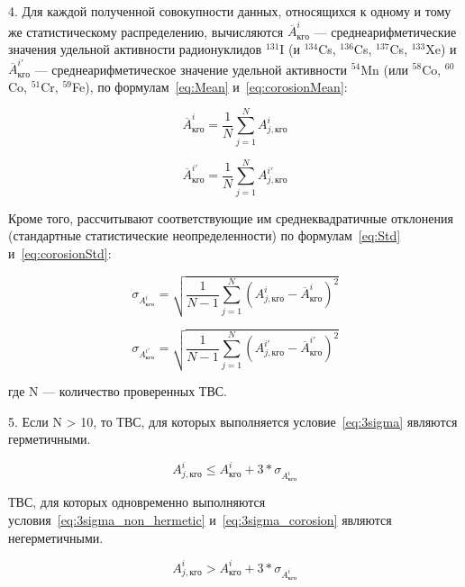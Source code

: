 4. Для каждой полученной совокупности данных, относящихся к одному
и тому же статистическому распределению, вычисляются $\overline{A}_{кго}^{i}$ --- среднеарифметические значения удельной активности радионуклидов $^{131}$I (и $^{134}$Cs, $^{136}$Cs, $^{137}$Cs, $^{133}$Xe) и $\overline{A}_{кго}^{i'}$ --- среднеарифметическое значение удельной активности $^{54}$Mn (или $^{58}$Co, $^{60}$Co, $^{51}$Cr, $^{59}$Fe), по формулам~\ref{eq:Mean} и~\ref{eq:corosionMean}:

\begin{equation} \label{eq:Mean}
	\overline{A}_{кго}^{i} = \frac{1}{N}\sum_{j=1}^{N}A_{j,кго}^{i}
\end{equation}

\begin{equation} \label{eq:corosionMean}
	\overline{A}_{кго}^{i'} = \frac{1}{N}\sum_{j=1}^{N}A_{j,кго}^{i'}
\end{equation}

Кроме того, рассчитывают соответствующие им среднеквадратичные
отклонения (стандартные статистические неопределенности) по формулам~\ref{eq:Std} и~\ref{eq:corosionStd}:

\begin{equation} \label{eq:Std}
	\sigma_{{A}_{кго}^{i}} = \sqrt{\frac{1}{N-1}\sum_{j=1}^{N}(A_{j,кго}^{i} - \overline{A}_{кго}^{i})^2}
\end{equation}
	
\begin{equation} \label{eq:corosionStd}
	\sigma_{{A}_{кго}^{i'}} = \sqrt{\frac{1}{N-1}\sum_{j=1}^{N}(A_{j,кго}^{i'} - \overline{A}_{кго}^{i'})^2}
\end{equation}

где N --- количество проверенных ТВС.

5. Если N > 10, то ТВС, для которых выполняется условие~\ref{eq:3sigma} являются герметичными.

\begin{equation} \label{eq:3sigma}
	A_{j,кго}^{i} \leq {A}_{кго}^{i} + 3*\sigma_{{A}_{кго}^{i}}
\end{equation}

ТВС, для которых одновременно выполняются условия~\ref{eq:3sigma_non_hermetic} и~\ref{eq:3sigma_corosion} являются негерметичными.

\begin{equation} \label{eq:3sigma_non_hermetic}
	A_{j,кго}^{i} > {A}_{кго}^{i} + 3*\sigma_{{A}_{кго}^{i}}
\end{equation}

